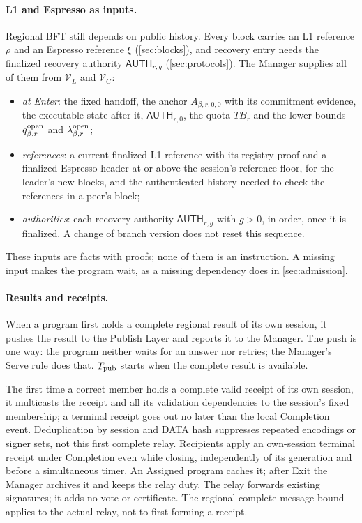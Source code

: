 \documentclass[11pt,a4paper]{article}
\newcommand{\TB}{\mathit{TB}}
\newcommand{\tagg}[1]{\ensuremath{\mathsf{#1}}}
\newcounter{protocol}
\begin{document}
\paragraph{L1 and Espresso as inputs.}
Regional BFT still depends on public history. Every block carries an L1
reference $\rho$ and an Espresso reference $\xi$
(\cref{sec:blocks}), and recovery entry needs the finalized recovery
authority $\tagg{AUTH}_{r,g}$ (\cref{sec:protocols}). The Manager
supplies all of them from $\mathcal V_L$ and $\mathcal V_G$:
\begin{itemize}
\item \emph{at Enter}: the fixed handoff, the anchor $A_{\beta,r,0,0}$
with its commitment evidence, the executable state after it,
$\tagg{AUTH}_{r,0}$, the quota $\TB_r$ and the lower bounds
$q^{\rm open}_{\beta,r}$ and $\lambda^{\rm open}_{\beta,r}$;
\item \emph{references}: a current finalized L1 reference with its
registry proof and a finalized Espresso header at or above the session's
reference floor, for the leader's new blocks, and the authenticated history
needed to check the references in a peer's block;
\item \emph{authorities}: each recovery authority $\tagg{AUTH}_{r,g}$
with $g>0$, in order, once it is finalized. A change of branch version
does not reset this sequence.
\end{itemize}
These inputs are facts with proofs; none of them is an instruction. A
missing input makes the program wait, as a missing dependency does in
\cref{sec:admission}.

\paragraph{Results and receipts.}
\label{sec:retirement-receipt-relay}
When a program first holds a complete regional result of its own
session, it pushes the result to the Publish Layer and reports it to the
Manager. The push is one way: the program neither waits for an answer
nor retries; the Manager's Serve rule does that. $T_{\rm pub}$ starts
when the complete result is available.

The first time a correct member holds a complete valid receipt of its
own session, it multicasts the receipt and all its validation
dependencies to the session's fixed membership; a terminal receipt goes
out no later than the local Completion event. Deduplication by session
and DATA hash suppresses repeated encodings or signer sets, not this
first complete relay. Recipients apply an own-session terminal receipt
under Completion even while closing, independently of its generation and
before a simultaneous timer. An Assigned program caches it; after Exit
the Manager archives it and keeps the relay duty. The relay forwards
existing signatures; it adds no vote or certificate. The regional
complete-message bound applies to the actual relay, not to first forming
a receipt.
\end{document}
